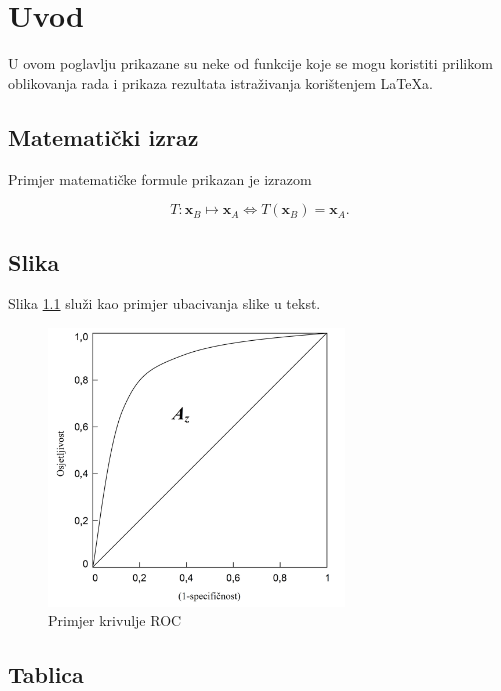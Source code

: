 


\chapter{Uvod}

U ovom poglavlju prikazane su neke od funkcije koje se mogu koristiti prilikom
oblikovanja rada i prikaza rezultata istraživanja korištenjem \LaTeX a.

\section{Matematički izraz}


Primjer matematičke formule prikazan je izrazom

\begin{equation}
  T: \mathbf{x}_B \mapsto \mathbf{x}_A \Leftrightarrow T(\mathbf{x}_B) = \mathbf{x}_A.
  \label{eq:transformacija}
\end{equation}


\section{Slika}


Slika \ref{fig:roc_example} služi kao primjer ubacivanja slike u tekst.

\begin{figure}
  \centering
  \includegraphics[width=0.7\textwidth]{roc_example}
  \caption{Primjer krivulje ROC}
  \label{fig:roc_example}
\end{figure}


\section{Tablica}


